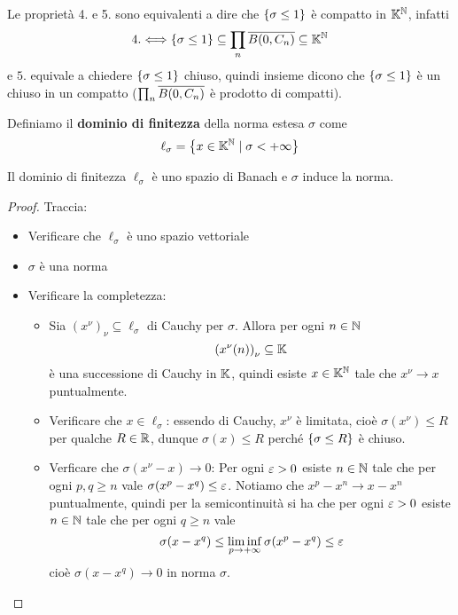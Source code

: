 \begin{remark}
Le propriet\`a 4. e 5. sono equivalenti a dire che $\left\{{\sigma\leq 1}\right\}$ \`e compatto in $\mathbb{K}^{\mathbb{N}}$, infatti
\[4.\Longleftrightarrow \left\{{\sigma\leq 1}\right\}\subseteq \prod_n\overline{B(0,C_n)}\subseteq \mathbb{K}^{\mathbb{N}}\]
e $5.$ equivale a chiedere $\left\{{\sigma\leq 1}\right\}$ chiuso, quindi insieme dicono che $\left\{{\sigma\leq 1}\right\}$ \`e un chiuso in un compatto ($\prod_n\overline{B(0,C_n)}$ \`e prodotto di compatti).
\end{remark}

\begin{definition}
Definiamo il \textbf{dominio di finitezza} della norma estesa $\sigma$ come
\[\ell_\sigma=\left\{{x\in\mathbb{K}^{\mathbb{N}}\mid \sigma<+\infty}\right\}\]
\end{definition}

\begin{exercise}
Il dominio di finitezza $\ell_\sigma$ \`e uno spazio di Banach e $\sigma$ induce la norma.
\end{exercise}
\begin{proof}
Traccia:
\begin{itemize}
    \item Verificare che $\ell_\sigma$ \`e uno spazio vettoriale
    \item $\sigma$ \`e una norma
    \item Verificare la completezza: 
    \begin{itemize}
        \item Sia $(x^\nu)_\nu\subseteq \ell_\sigma$ di Cauchy per $\sigma$. Allora per ogni $n\in\mathbb{N}$
        \[\left({x^\nu(n)}\right)_\nu\subseteq \mathbb{K}\]
        \`e una successione di Cauchy in $\mathbb{K}$, quindi esiste $x\in\mathbb{K}^{\mathbb{N}}$ tale che $x^\nu\to x$ puntualmente.
        \item Verificare che $x\in\ell_\sigma$: essendo di Cauchy, $x^\nu$ \`e limitata, cio\`e $\sigma(x^\nu)\leq R$ per qualche $R\in \mathbb{R}$, dunque $\sigma(x)\leq R$ perch\'e $\left\{{\sigma\leq R}\right\}$ \`e chiuso.
        \item Verficare che $\sigma(x^\nu-x)\to 0$: Per ogni $\varepsilon>0$ esiste $n\in\mathbb{N}$ tale che per ogni $p,q\geq n$ vale $\sigma(x^p-x^q)\leq \varepsilon$. Notiamo che $x^p-x^n\to x-x^n$ puntualmente, quindi per la semicontinuit\`a si ha che per ogni $\varepsilon>0$ esiste $n\in\mathbb{N}$ tale che per ogni $q\geq n$ vale
        \[\sigma(x-x^q)\leq\liminf_{p\to +\infty}\sigma(x^p-x^q)\leq  \varepsilon\]
        cio\`e $\sigma(x-x^q)\to 0$ in norma $\sigma$.
    \end{itemize}
\end{itemize}
\end{proof}

